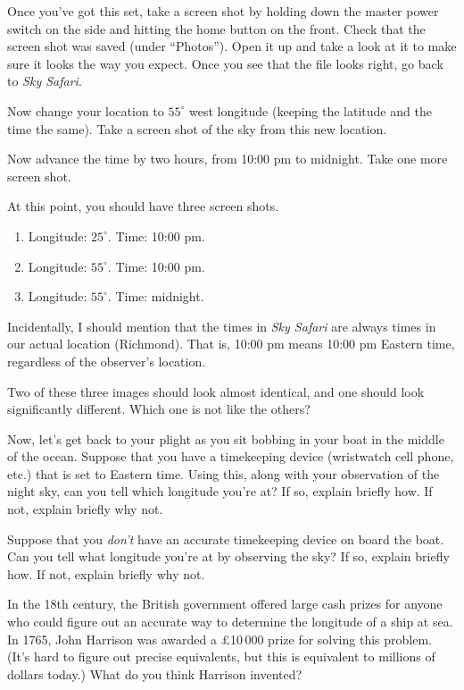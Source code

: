 Once you've got this set, take a screen shot by holding down
the master power switch on the side and hitting the home button
on the front.
Check that the screen shot was saved (under ``Photos'').
Open it up and take a look at it to make sure it looks
the way you expect. 
Once you see that the file looks right, go back to \textit{Sky Safari}.

Now change your location to $55^\circ$ west longitude (keeping
the latitude and the time the same).
Take a screen shot of the sky from this new location.

Now advance the time by two hours, from 10:00 pm to midnight.
Take one more screen shot.

At this point, you should have three screen shots.
\begin{enumerate}
\item Longitude: $25^\circ$. Time: 10:00 pm.
\item Longitude: $55^\circ$. Time: 10:00 pm.
\item Longitude: $55^\circ$. Time: midnight.
\end{enumerate}
Incidentally, I should mention that the times in \textit{Sky Safari}
are always times in our actual location (Richmond). That is, 10:00 pm
means 10:00 pm Eastern time, regardless of the observer's location.

Two of these three images should look almost identical, and one
should look significantly different. Which one is not like the others?

\vskip 1in

\newpage

Now, let's get back to your plight as you sit bobbing in your boat
in the middle of the ocean. Suppose that you have a timekeeping
device (wristwatch cell phone, etc.) that is set to Eastern
time. Using this, along with your observation of the night
sky, can you tell which longitude you're at? If so, explain
briefly how. If not, explain briefly why not.

\vskip 3in

Suppose that you \textit{don't} have an accurate timekeeping device
on board the boat. Can you tell what longitude you're at by
observing the sky? If so, explain
briefly how. If not, explain briefly why not.

\vskip 3in

In the 18th century, the British government offered large
cash prizes for anyone who could figure out an accurate way
to determine the longitude of a ship at sea. 
In 1765, John Harrison was awarded a \pounds 10\,000 prize
for solving this problem. (It's hard to
figure out precise equivalents, but this is 
equivalent to  millions of dollars today.) 
What do you think Harrison invented?


